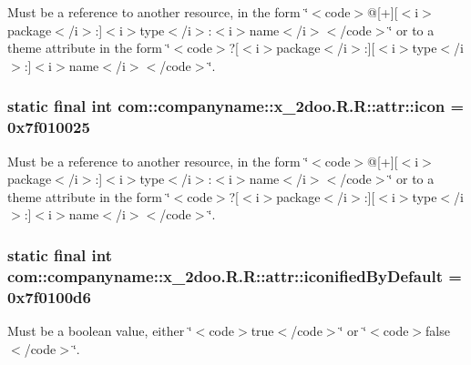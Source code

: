 Must be a reference to another resource, in the form \char`\"{}$<$code$>$@\mbox{[}+\mbox{]}\mbox{[}$<$i$>$package$<$/i$>$:\mbox{]}$<$i$>$type$<$/i$>$:$<$i$>$name$<$/i$>$$<$/code$>$\char`\"{} or to a theme attribute in the form \char`\"{}$<$code$>$?\mbox{[}$<$i$>$package$<$/i$>$:\mbox{]}\mbox{[}$<$i$>$type$<$/i$>$:\mbox{]}$<$i$>$name$<$/i$>$$<$/code$>$\char`\"{}. \hypertarget{classcom_1_1companyname_1_1x__2doo_1_1_r_1_1attr_23b2ca661e91819ba4c1a3b260a8ab2e}{
\subsubsection[{icon}]{\setlength{\rightskip}{0pt plus 5cm}static final int com::companyname::x\_\-2doo.R.R::attr::icon = 0x7f010025}}
\label{classcom_1_1companyname_1_1x__2doo_1_1_r_1_1attr_23b2ca661e91819ba4c1a3b260a8ab2e}


Must be a reference to another resource, in the form \char`\"{}$<$code$>$@\mbox{[}+\mbox{]}\mbox{[}$<$i$>$package$<$/i$>$:\mbox{]}$<$i$>$type$<$/i$>$:$<$i$>$name$<$/i$>$$<$/code$>$\char`\"{} or to a theme attribute in the form \char`\"{}$<$code$>$?\mbox{[}$<$i$>$package$<$/i$>$:\mbox{]}\mbox{[}$<$i$>$type$<$/i$>$:\mbox{]}$<$i$>$name$<$/i$>$$<$/code$>$\char`\"{}. \hypertarget{classcom_1_1companyname_1_1x__2doo_1_1_r_1_1attr_d87051f7c5a80c2160849af1891e35f9}{
\subsubsection[{iconifiedByDefault}]{\setlength{\rightskip}{0pt plus 5cm}static final int com::companyname::x\_\-2doo.R.R::attr::iconifiedByDefault = 0x7f0100d6}}
\label{classcom_1_1companyname_1_1x__2doo_1_1_r_1_1attr_d87051f7c5a80c2160849af1891e35f9}


Must be a boolean value, either \char`\"{}$<$code$>$true$<$/code$>$\char`\"{} or \char`\"{}$<$code$>$false$<$/code$>$\char`\"{}. 

